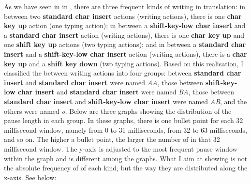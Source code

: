 \documentclass[output=paper]{LSP/langsci}
\begin{document}
As we have seen in  in , there are three frequent kinds of writing  in translation: in between two \textbf{standard char insert} actions (writing actions), there is one \textbf{char key up} action (one typing action); in between a \textbf{shift-key-low char insert} and a \textbf{standard char insert} action (writing actions), there is one  \textbf{char key up} and one \textbf{shift key up} actions (two typing actions); and in between a \textbf{standard char insert} and a \textbf{shift-key-low char insert} action (writing actions), there is a \textbf{char key up} and a \textbf{shift key down} (two typing actions). Based on this realisation, I classified the  between writing actions into four groups:  between \textbf{standard char insert} and \textbf{standard char insert} were named \emph{AA}, those between \textbf{shift-key-low char insert} and \textbf{standard char insert} were named \emph{BA}, those between \textbf{standard char insert} and \textbf{shift-key-low char insert} were named \emph{AB}, and the others were named \emph{o}. Below are three graphs showing the distribution of the pause length in each group. In these graphs, there is one bullet point for each 32 millisecond window, namely from 0 to 31 milliseconds, from 32 to 63 milliseconds, and so on. The higher a bullet point, the larger the number of  in that 32 millisecond window. The y-axis is adjusted to the most frequent pause window within the graph and is different among the graphs. What I aim at showing is not the absolute frequency of  of each kind, but the way they are distributed along the x-axis. See below:

\fboxsep=1pt%
\fboxrule=1pt%
\end{document}
